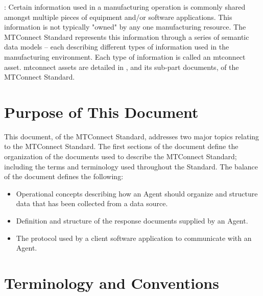 :  Certain information used in a manufacturing operation is commonly shared amongst multiple pieces of equipment and/or software applications.  This information is not typically "owned" by any one manufacturing resource.  The MTConnect Standard represents this information through a series of \glspl{semantic data model} – each describing different types of information used in the manufacturing environment.  Each type of information is called an \gls{mtconnect asset}. \glspl{mtconnect asset} are detailed in , and its sub-\glspl{part document}, of the MTConnect Standard.

\section{Purpose of This Document}

This document,  of the \gls{MTConnect}  Standard, addresses two major topics relating to the MTConnect Standard.  The first sections of the document define the organization of the documents used to describe the MTConnect Standard; including the terms and terminology used throughout the Standard.  The balance of the document defines the following:

\begin{itemize}
\item Operational concepts describing how an \gls{Agent} should organize and structure data that has been collected from a data source.

\item Definition and structure of the \glspl{response document} supplied by an \gls{Agent}.

\item The protocol used by a client software application to communicate with an \gls{Agent}.
\end{itemize}

\section{Terminology and Conventions} \label{sec:Terminology and Conventions} 

\printglossary


\printbibliography[title=MTConnect References,keyword=MTC]


\printbibliography[title=Other References,notkeyword=MTC]

\nolinenumbers
\glsaddallunused
\nolinenumbers

\linenumbers
